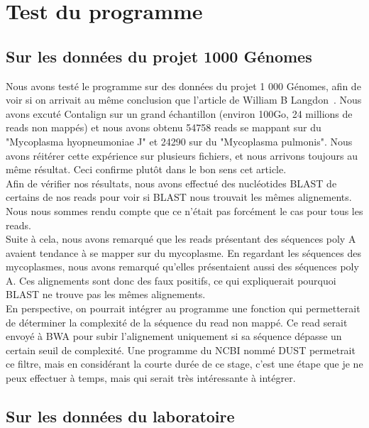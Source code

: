 \documentclass[a4paper,12pt]{article}
\begin{document}
\section{Test du programme}

\subsection{Sur les données du projet 1000 Génomes}

Nous avons testé le programme sur des données du projet 1 000 Génomes, afin de voir si on arrivait au même conclusion que l'article de William B Langdon~\cite{mycoplasme}. Nous avons excuté Contalign sur un grand échantillon (environ 100Go, 24 millions de reads non mappés) et nous avons obtenu 54758 reads se mappant sur du "Mycoplasma hyopneumoniae J" et 24290 sur du "Mycoplasma pulmonis". Nous avons réitérer cette expérience sur plusieurs fichiers, et nous arrivons toujours au même résultat. Ceci confirme plutôt dans le bon sens cet article. \\

Afin de vérifier nos résultats, nous avons effectué des nucléotides BLAST de certains de nos reads pour voir si BLAST nous trouvait les mêmes alignements. Nous nous sommes rendu compte que ce n'était pas forcément le cas pour tous les reads. \\

Suite à cela, nous avons remarqué que les reads présentant des séquences poly A avaient tendance à se mapper sur du mycoplasme. En regardant les séquences des mycoplasmes, nous avons remarqué qu'elles présentaient aussi des séquences poly A. Ces alignements sont donc des faux positifs, ce qui expliquerait pourquoi BLAST ne trouve pas les mêmes alignements. \\

En perspective, on pourrait intégrer au programme une fonction qui permetterait de déterminer la complexité de la séquence du read non mappé. Ce read serait envoyé à BWA pour subir l'alignement uniquement si sa séquence dépasse un certain seuil de complexité. Une programme du NCBI nommé DUST permetrait ce filtre, mais en considérant la courte durée de ce stage, c'est une étape que je ne peux effectuer à temps, mais qui serait très intéressante à intégrer. 

\subsection{Sur les données du laboratoire}
\end{document}

